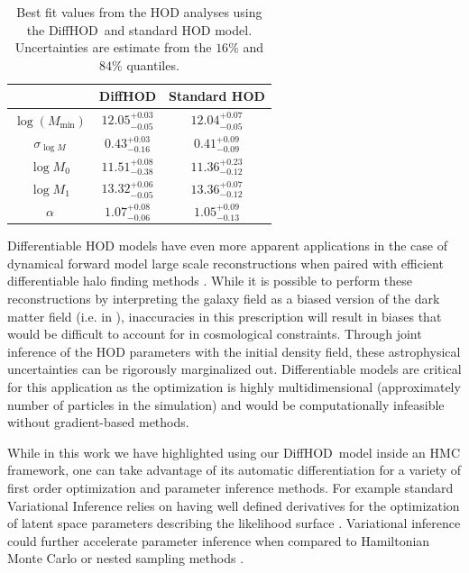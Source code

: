 \documentclass[a4paper,usenatbib]{mnras}
\newcommand{\dhod}{{\sc DiffHOD}}
\begin{document}
\begin{table}
\centering
\def\arraystretch{1.5}
     \begin{tabular}{ c | c | c }
 \hline\hline  
     & \dhod & Standard HOD \\ \hline
    $\log(M_\textrm{min})$ & $12.05^{+0.03}_{-0.05}$ & $12.04^{+0.07}_{-0.05}$ 
\\
    $\sigma_{\log{M}}$ & $0.43^{+0.03}_{-0.16}$ & $0.41^{+0.09}_{-0.09}$
\\
    $\log M_0$ & $11.51^{+0.08}_{-0.38}$ & $11.36^{+0.23}_{-0.12}$ 
\\
    $\log{M_1}$ & $13.32^{+0.06}_{-0.05}$ & $13.36^{+0.07}_{-0.12}$
\\
 $\alpha$ & $1.07^{+0.08}_{-0.06}$ & $1.05^{+0.09}_{-0.13}$
\\
  \hline
 \end{tabular}
 \caption{Best fit values from the HOD analyses using the \dhod~and standard 
 HOD model. Uncertainties are estimate from the $16\%$ and $84\%$ quantiles.} 
 \label{table:values}
\end{table}
Differentiable HOD models have even more apparent applications in the case of dynamical forward model large scale reconstructions \citep{2017JCAP...12..009S} when paired with efficient differentiable halo finding methods \citep{2018JCAP...10..028M,2020arXiv201011847M,2019PhRvD.100d3515K}. While it is possible to perform these reconstructions by interpreting the galaxy field as a biased version of the dark matter field (i.e. in \cite{2021TARDISII}), inaccuracies in this prescription will result in biases that would be difficult to account for in cosmological constraints. Through joint inference of the HOD parameters with the initial density field, these astrophysical uncertainties can be rigorously marginalized out. Differentiable models are critical for this application as the optimization is highly multidimensional (approximately number of particles in the simulation) and would be computationally infeasible without gradient-based methods.

While in this work we have highlighted using our \dhod~model inside an HMC framework, one can take advantage of its automatic differentiation for a variety of first order optimization and parameter inference methods. For example standard Variational Inference relies on having well defined derivatives for the optimization of latent space parameters describing the likelihood surface \citep{peterson1987mean,2003PhDT.......250B,2016arXiv160100670B}. Variational inference could further accelerate parameter inference when compared to Hamiltonian Monte Carlo or nested sampling methods \cite{2018arXiv180306473G}.
\end{document}
